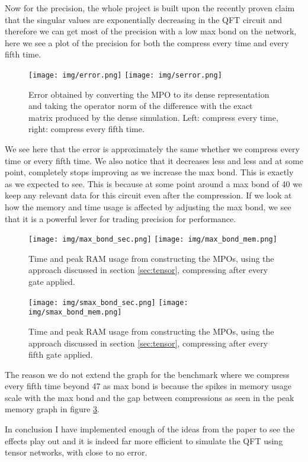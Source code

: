 \vspace{\baselineskip}
\noindent
Now for the precision, the whole project is built upon the recently proven claim that the singular values are exponentially decreasing in the QFT circuit and therefore we can get most of the precision with a low max bond on the network, here we see a plot of the precision for both the compress every time and every fifth time. 
\begin{figure}[H]
    \begin{center}
        \texttt{[image: img/error.png]}
        \texttt{[image: img/serror.png]}
    \end{center}
    \caption{Error obtained by converting the MPO to its dense representation and taking the operator norm of the difference with the exact matrix produced by the dense simulation. Left: compress every time, right: compress every fifth time. }
    \label{fig:tensor_error}
\end{figure}
\noindent
We see here that the error is approximately the same whether we compress every time or every fifth time. We also notice that it decreases less and less and at some point, completely stops improving as we increase the max bond. This is exactly as we expected to see. This is because at some point around a max bond of 40 we keep any relevant data for this circuit even after the compression. If we look at how the memory and time usage is affected by adjusting the max bond, we see that it is a powerful lever for trading precision for performance. 

\begin{figure}[H]
    \begin{center}
        \texttt{[image: img/max\_bond\_sec.png]}
        \texttt{[image: img/max\_bond\_mem.png]}
    \end{center}
    \caption{Time and peak RAM usage from constructing the MPOs, using the approach discussed in section \ref{sec:tensor}, compressing after every gate applied.}
    \label{fig:tensor_perf_max_bond}
\end{figure}
\begin{figure}[H]
    \begin{center}
        \texttt{[image: img/smax\_bond\_sec.png]}
        \texttt{[image: img/smax\_bond\_mem.png]}
    \end{center}
    \caption{Time and peak RAM usage from constructing the MPOs, using the approach discussed in section \ref{sec:tensor}, compressing after every fifth gate applied.}
    \label{fig:stensor_perf_max_bond}
\end{figure}
\noindent
The reason we do not extend the graph for the benchmark where we compress every fifth time beyond 47 as max bond is because the spikes in memory usage scale with the max bond and the gap between compressions as seen in the peak memory graph in figure \ref{fig:stensor_perf_max_bond}. 

\vspace{\baselineskip}
\noindent
In conclusion I have implemented enough of the ideas from the paper to see the effects play out and it is indeed far more efficient to simulate the QFT using tensor networks, with close to no error. 
